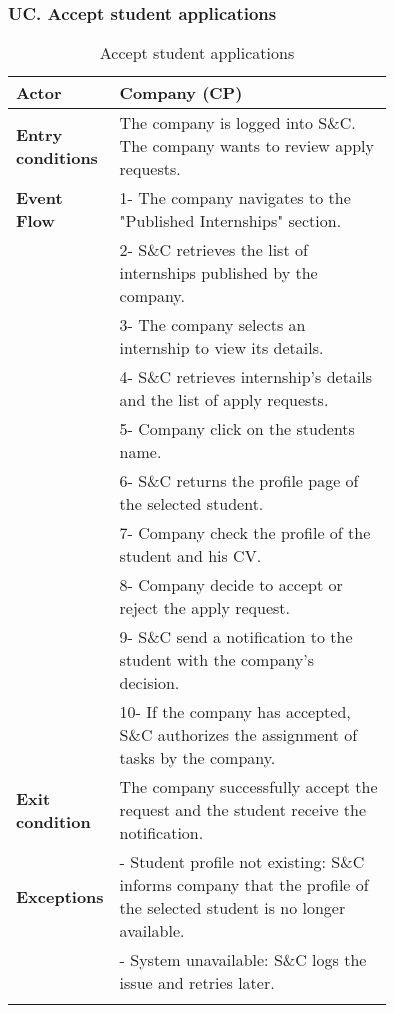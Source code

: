 \subsubsection*{UC\cuc . Accept student applications}
\begin{center}
    \begin{longtable}{|l|p{0.75\linewidth}|}
        \hline
        \textbf{Actor}            & Company (CP)\\
        \hline
        \textbf{Entry conditions} & The company is logged into S\&C. The company wants to review apply requests.\\
        \hline
        \textbf{Event Flow}     & 1- The company navigates to the "Published                                                        Internships" section. \\
                                & 2- S\&C retrieves the list of internships published by the company. \\
                                & 3- The company selects an internship to view its details. \\
                                & 4- S\&C retrieves internship's details and the list of apply requests.\\
                                & 5- Company click on the students name.\\
                                & 6- S\&C returns the profile page of the selected student.\\
                                & 7- Company check the profile of the student and his CV.\\
                                & 8- Company decide to accept or reject the apply request.\\
                                & 9- S\&C send a notification to the student with the company’s decision.\\
                                & 10- If the company has accepted, S\&C authorizes the assignment of tasks by the company.\\
        \hline
        \textbf{Exit condition}     & The company successfully accept the request and the student receive the notification.\\       
        \hline
        \textbf{Exceptions}     & - Student profile not existing: S\&C informs company that the profile of the selected student is no longer available. \\
                                & - System unavailable: S\&C logs the issue and retries later. \\
        \hline
        \caption{Accept student applications}
        \label{tab: accept_student_applications_usecase}
    \end{longtable}
\end{center}


